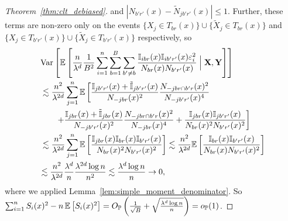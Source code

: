 \begin{proof}[Theorem~\ref{thm:clt_debiased}]
  and $|N_{b' r'}(x) - \tilde N_{j b' r'}(x)| \leq 1$.
  Further, these terms are non-zero only on the events
  $\{ X_j \in T_{b r}(x) \} \cup \{ \tilde X_j \in T_{b r}(x) \}$
  and
  $\{ X_j \in T_{b' r'}(x) \} \cup \{ \tilde X_j \in T_{b' r'}(x) \}$
  respectively, so
  \begin{align*}
    &\operatorname{Var} \left[
      \mathbb{E} \left[
        \frac{n}{\lambda^d}
        \frac{1}{B^2}
        \sum_{i=1}^n
        \sum_{b=1}^B
        \sum_{b' \neq b}
        \frac{\mathbb{I}_{i b r}(x) \mathbb{I}_{i b' r'}(x) \varepsilon_i^2}
        {N_{b r}(x) N_{b' r'}(x)}
        \Bigm| \mathbf{X}, \mathbf{Y}
      \right]
    \right] \\
    &\, \lesssim
    \frac{n^2}{\lambda^{2d}}
    \sum_{j=1}^{n}
    \mathbb{E} \left[
      \frac{\mathbb{I}_{j b' r'}(x) + \tilde {\mathbb{I}}_{j b' r'}(x)}{N_{-j b r}(x)^2}
      \frac{N_{-j b r \cap b' r}(x)^2} {N_{-j b' r'}(x)^4}
      \right. \\
      &\left.
      \qquad+
      \frac{\mathbb{I}_{j b r}(x) + \tilde {\mathbb{I}}_{j b r}(x)}{N_{-j b' r'}(x)^2}
      \frac{N_{-j b r \cap b' r}(x)^2} {N_{-j b r}(x)^4}
      +
      \frac{\mathbb{I}_{j b r}(x) \mathbb{I}_{j b' r'}(x)}
      {N_{b r}(x)^2 N_{b' r'}(x)^2}
    \right] \\
    &\, \lesssim
    \frac{n^2}{\lambda^{2d}}
    \sum_{j=1}^{n}
    \mathbb{E} \left[
      \frac{\mathbb{I}_{j b r}(x) \mathbb{I}_{b r}(x) \mathbb{I}_{b' r'}(x)}
      {N_{b r}(x)^2 N_{b' r'}(x)^2}
    \right]
    \lesssim
    \frac{n^2}{\lambda^{2d}}
    \mathbb{E} \left[
      \frac{\mathbb{I}_{b r}(x) \mathbb{I}_{b' r'}(x)}
      {N_{b r}(x) N_{b' r'}(x)^2}
    \right] \\
    &\lesssim
    \frac{n^2}{\lambda^{2d}}
    \frac{\lambda^d}{n}
    \frac{\lambda^{2d} \log n}{n^2}
    \lesssim
    \frac{\lambda^d \log n}{n}
    \to 0,
  \end{align*}
  where we applied Lemma~\ref{lem:simple_moment_denominator}.
  So
  $\sum_{i=1}^{n} S_i(x)^2 - n \,\mathbb{E} \left[ S_i(x)^2 \right]
  = O_{\mathbb{P}} \left( \frac{1}{\sqrt B} + \sqrt{\frac{\lambda^d \log n}{n}} \right)
  = o_{\mathbb{P}}(1)$.


\end{proof}
